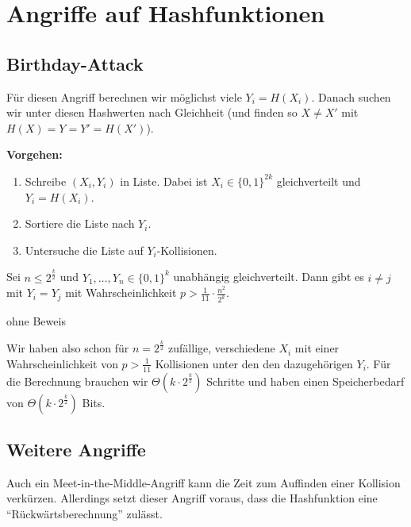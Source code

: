 \section{Angriffe auf Hashfunktionen}
\subsection{Birthday-Attack}
Für diesen Angriff berechnen wir möglichst viele $Y_i = H(X_i)$.
Danach suchen wir unter diesen Hashwerten nach Gleichheit (und finden so $X \not = X'$ mit $H(X) = Y = Y' = H(X')$).
\vspace{10pt}

\textbf{Vorgehen:}
\begin{enumerate}
  \item Schreibe $(X_i, Y_i)$ in Liste. Dabei ist $X_i \in \{0,1\}^{2k}$ gleichverteilt und $Y_i = H(X_i)$.
  \item Sortiere die Liste nach $Y_i$.
  \item Untersuche die Liste auf $Y_i$-Kollisionen.
\end{enumerate}
\vspace{10pt}

\begin{theorem}
Sei $n \leq 2^{\frac{k}{2}}$ und $Y_1, \ldots , Y_n \in \{0,1\}^k$ unabhängig gleichverteilt. Dann gibt es $i \not = j$ mit $Y_i = Y_j$ mit Wahrscheinlichkeit
$p > \frac{1}{11} \cdot \frac{n^2}{2^k}$.
\end{theorem}
\vspace{10pt}
\begin{beweis}
  ohne Beweis
\end{beweis}
Wir haben also schon für $n = 2^{\frac{k}{2}}$ zufällige, verschiedene $X_i$ mit einer Wahrscheinlichkeit von $p > \frac{1}{11}$ Kollisionen unter den
den dazugehörigen $Y_i$. Für die Berechnung brauchen wir $\Theta(k \cdot 2^{\frac{k}{2}})$ Schritte und haben einen Speicherbedarf von $\Theta(k \cdot
2^{\frac{k}{2}})$ Bits.

\subsection{Weitere Angriffe}
Auch ein Meet-in-the-Middle-Angriff kann die Zeit zum Auffinden einer Kollision verkürzen. Allerdings setzt dieser Angriff voraus, dass die
Hashfunktion eine "`Rückwärtsberechnung"' zulässt.
